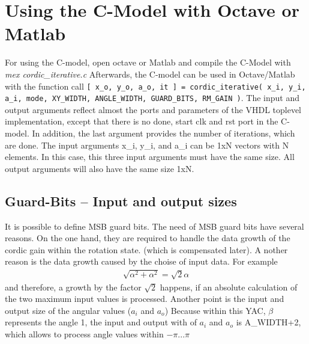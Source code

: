 \documentclass[a4paper, 12pt, notitlepage]{report}
\begin{document}
\chapter{Using the C-Model with Octave or Matlab}
For using the C-model, open octave or Matlab and compile the C-Model
with \newline
\textit{mex cordic\_iterative.c}
Afterwards, the C-model can be used in Octave/Matlab with the function call\newline
{\tt [ x\_o, y\_o, a\_o, it ] = cordic\_iterative( x\_i, y\_i, a\_i, mode, XY\_WIDTH, ANGLE\_WIDTH,
GUARD\_BITS, RM\_GAIN )}.\newline
The input and output arguments reflect almost the ports and parameters of the 
VHDL toplevel implementation, except that there is no done, start clk and rst port 
in the C-model. In addition, the last argument provides the number of iterations,
which are done.\newline \newline
The input arguments x\_i, y\_i, and a\_i can be 1xN vectors with N elements.
In this case, this three input arguments must have the same size. All
output arguments will also have the same size 1xN.



\section{Guard-Bits -- Input and output sizes}
It is possible to define MSB guard bits.
The need of MSB guard bits have several reasons. On the one hand,
they are required to handle the data growth of the cordic gain within the rotation state.
(which is compensated later). A nother reason is the data growth caused by the choise of
input data. For example 
\begin{eqnarray}
   \sqrt{ \alpha^2 + \alpha^2 } = \sqrt{2} \alpha
\end{eqnarray}
and therefore, a growth by the factor $\sqrt{2}$ happens, if an absolute calculation
of the two maximum input values is processed.\newline
\newline
Another point is the input and output size of the angular values ($a_i$ and $a_o$)
Because within this YAC, $\beta$ represents the angle 1, the input and output with
of $a_i$ and $a_o$ is A\_WIDTH+2, which allows to process angle values within
$-\pi ... \pi$
\end{document}
